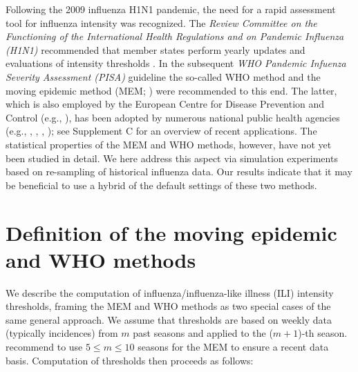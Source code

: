\documentclass{article}
\begin{document}
Following the 2009 influenza H1N1 pandemic, the need for a rapid assessment tool for influenza intensity was recognized. The \textit{Review Committee on the Functioning of the
International Health Regulations and on Pandemic Influenza (H1N1)} recommended that member states perform yearly updates and evaluations of intensity thresholds \citep[p.118]{WHO2011}. In the subsequent \textit{WHO Pandemic Infuenza Severity Assessment (PISA)} guideline \citep{WHO2017} the so-called WHO method \citep{WHO2014} and the moving epidemic method (MEM; \citealt{Vega2013, Vega2015}) were recommended to this end. The latter, which is also employed by the European Centre for Disease Prevention and Control (e.g., \citealt{ECDC2017}), has been adopted by numerous national public health agencies (e.g., \citealt{Dahlgren2019}, \citealt{Rakocevic2019}, \citealt{RedondoBravo2020}, \citealt{Vos2019}); see Supplement C for an overview of recent applications. The statistical properties of the MEM and WHO methods, however, have not yet been studied in detail. We here address this aspect via simulation experiments based on re-sampling of historical influenza data. Our results indicate that it may be beneficial to use a hybrid of the default settings of these two methods.%


\section{Definition of the moving epidemic and WHO methods}
\label{sec:definitions}

We describe the computation of influenza/influenza-like illness (ILI) intensity thresholds, framing the MEM and WHO methods as two special cases of the same general approach. We assume that thresholds are based on weekly data (typically incidences) from $m$ past seasons and applied to the ($m + 1$)-th season. \cite{Vega2015} recommend to use $5 \leq m \leq 10$ seasons for the MEM to ensure a recent data basis. Computation of thresholds then proceeds as follows:
\end{document}
